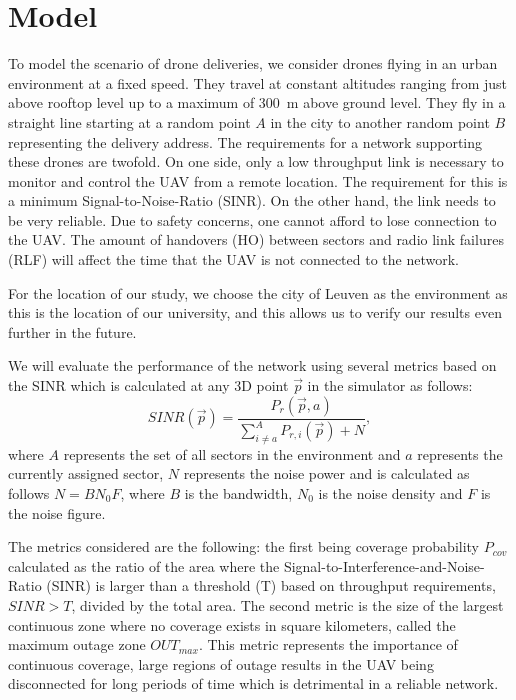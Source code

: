 \documentclass[conference,twocolumn,a4paper]{IEEEtran}
\begin{document}
\section{Model}
\label{sec:model}

\par To model the scenario of drone deliveries, we consider drones flying in an urban environment at a fixed speed. They travel at constant altitudes ranging from just above rooftop level up to a maximum of 300~m above ground level. They fly in a straight line starting at a random point $A$ in the city to another random point $B$ representing the delivery address. The requirements for a network supporting these drones are twofold. On one side, only a low throughput link is necessary to monitor and control the UAV from a remote location. The requirement for this is a minimum Signal-to-Noise-Ratio (SINR). On the other hand, the link needs to be very reliable. Due to safety concerns, one cannot afford to lose connection to the UAV. The amount of handovers (HO) between sectors and radio link failures (RLF) will affect the time that the UAV is not connected to the network.
\par For the location of our study, we choose the city of Leuven as the environment as this is the location of our university, and this allows us to verify our results even further in the future.
\par We will evaluate the performance of the network using several metrics based on the SINR which is calculated at any 3D point $\vec{p}$ in the simulator as follows: \begin{equation}
	\label{eq:sinr_interference_noise}
	SINR (\vec{p}) = \frac{P_r(\vec{p},a)}{\sum^{A}_{i \neq a} P_{r, i}(\vec{p}) + N},
\end{equation}
where $A$ represents the set of all sectors in the environment and $a$ represents the currently assigned sector, $N$ represents the noise power and is calculated as follows $N = BN_0F$, where $B$ is the bandwidth, $N_0$ is the noise density and $F$ is the noise figure. 
\par The metrics considered are the following: the first being coverage probability $P_{cov}$ calculated as the ratio of the area where the Signal-to-Interference-and-Noise-Ratio (SINR) is larger than a threshold (T) based on throughput requirements, $SINR > T$, divided by the total area. The second metric is the size of the largest continuous zone where no coverage exists in square kilometers, called the maximum outage zone $OUT_{max}$. This metric represents the importance of continuous coverage, large regions of outage results in the UAV being disconnected for long periods of time which is detrimental in a reliable network.
\end{document}
